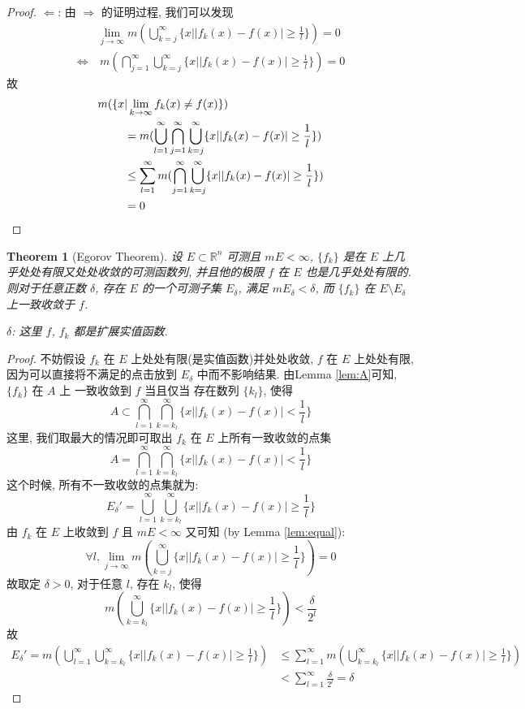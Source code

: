 \documentclass{article}
\newtheorem{theorem}{Theorem}
\begin{document}
\begin{proof}
  $\Leftarrow$: 由 $\Rightarrow$ 的证明过程, 我们可以发现
  \begin{align*}
   & \lim_{j\to\infty} m (\bigcup_{k=j}^\infty\{x| |f_k(x) - f(x)| \geq \frac{1}{l} \}) = 0 \\
   \Leftrightarrow &\ m (\bigcap_{j=1}^\infty\bigcup_{k=j}^\infty\{x| |f_k(x) - f(x)| \geq \frac{1}{l} \}) = 0 
  \end{align*}
  故
  \begin{align*}
    m(\{x&|\lim_{k\to\infty} f_k(x) \not= f(x)\}) \\
    &= m(\bigcup_{l=1}^\infty\bigcap_{j=1}^\infty\bigcup_{k=j}^\infty\{x| |f_k(x) - f(x)| \geq \frac{1}{l} \}) \\
   &\leq \sum_{l=1}^\infty m(\bigcap_{j=1}^\infty\bigcup_{k=j}^\infty\{x| |f_k(x) - f(x)| \geq \frac{1}{l} \}) \\
   &= 0  \qedhere
  \end{align*}
\end{proof}
\begin{theorem}[Egorov Theorem]
  设 $E\subset \mathbb{R}^n$ 可测且 $mE < \infty$, $\{f_k\}$ 是在 $E$ 上几乎处处有限又处处收敛的可测函数列,
  并且他的极限 $f$ 在 $E$ 也是几乎处处有限的. 则对于任意正数 $\delta$, 存在 $E$ 的一个可测子集 $E_\delta$,
  满足 $mE_\delta < \delta$, 而 $\{f_k\}$ 在 $E\setminus E_\delta$ 上一致收敛于 $f$.

  $\delta$: 这里 $f$, $f_k$ 都是扩展实值函数.
\end{theorem}
\begin{proof}
  不妨假设 $f_k$ 在 $E$ 上处处有限(是实值函数)并处处收敛, $f$ 在 $E$ 上处处有限, 因为可以直接将不满足的点击放到 $E_\delta$ 中而不影响结果.
  由Lemma \ref{lem:A}可知, 
  $\{f_k\}$ 在 $A$ 上 一致收敛到 $f$ 当且仅当 存在数列 $\{k_l\}$, 使得 
  \[A \subset \bigcap_{l=1}^\infty \bigcap_{k=k_l}^\infty \{x| |f_k(x) - f(x)| < \frac{1}{l}\} \]
  这里, 我们取最大的情况即可取出 $f_k$ 在 $E$ 上所有一致收敛的点集
  \[A = \bigcap_{l=1}^\infty \bigcap_{k=k_l}^\infty \{x| |f_k(x) - f(x)| < \frac{1}{l}\} \]
  这个时候, 所有不一致收敛的点集就为:
  \[E_\delta' = \bigcup_{l=1}^\infty\bigcup_{k=k_l}^\infty \{x| |f_k(x) - f(x)| \geq \frac{1}{l}\}\]
  由 $f_k$ 在 $E$ 上收敛到 $f$ 且 $mE < \infty$ 又可知 (by Lemma \ref{lem:equal}):
  \[\forall l, \lim_{j\to\infty} m(\bigcup_{k=j}^\infty\{x| |f_k(x) - f(x)| \geq \frac{1}{l}\}) = 0\]
  故取定 $\delta > 0$, 对于任意 $l$, 存在 $k_l$, 使得
  \[m (\bigcup_{k=k_l}^\infty\{x| |f_k(x) - f(x)| \geq \frac{1}{l}\}) < \frac{\delta}{2^l}\]
  故
  \begin{align*}
    E_\delta' = m(\bigcup_{l=1}^\infty\bigcup_{k=k_l}^\infty \{x| |f_k(x) - f(x)| \geq \frac{1}{l}\}) 
    &\leq \sum_{l=1}^\infty m (\bigcup_{k=k_l}^\infty\{x| |f_k(x) - f(x)| \geq \frac{1}{l}\}) \\
    &< \sum_{l=1}^\infty \frac{\delta}{2^l} = \delta
  \end{align*}
\end{proof}
\end{document}
